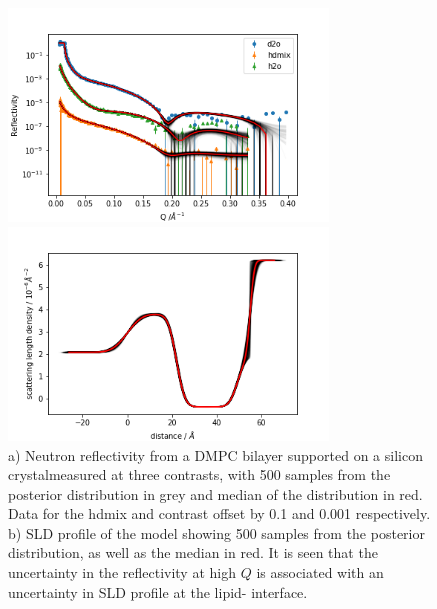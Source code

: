 \documentclass[pdf,preprint]{iucr}
\begin{document}
\begin{figure}%
\centering
\label{fig:global_fit}%
\includegraphics[width=85mm]{./supporting_information/global_fit.png}%

\includegraphics[width=85mm]{./supporting_information/d2o_sld_spread.png}

\caption{a) Neutron reflectivity from a DMPC bilayer supported on a silicon crystalmeasured at three contrasts, with 500 samples from the posterior distribution in grey and median of the distribution in red. Data for the hdmix and  contrast offset by 0.1 and 0.001 respectively. b) SLD profile of the  model showing 500 samples from the posterior distribution, as well as the median in red. It is seen that the uncertainty in the reflectivity at high $Q$ is associated with an uncertainty in SLD profile at the lipid- interface.}
\end{figure}
\end{document}
